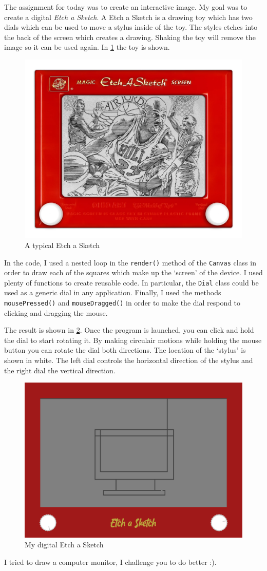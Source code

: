 The assignment for today was to create an interactive image. My goal was to create a digital \textit{Etch a Sketch}. A Etch a Sketch is a drawing toy which has two dials which can be used to move a stylus inside of the toy. The styles etches into the back of the screen which creates a drawing. Shaking the toy will remove the image so it can be used again. In \cref{fig: etch a sketch} the toy is shown.

\begin{figure}[H]
    \centering
    \includegraphics[width = 0.5 \textwidth]{Figures/day_4/etch_a_sketch.png}
    \caption{A typical Etch a Sketch}
    \label{fig: etch a sketch}
\end{figure}

In the code, I used a nested loop in the \texttt{render()} method of the \texttt{Canvas} class in order to draw each of the squares which make up the `screen' of the device. I used plenty of functions to create reusable code. In particular, the \texttt{Dial} class could be used as a generic dial in any application. Finally, I used the methods \texttt{mousePressed()} and \texttt{mouseDragged()} in order to make the dial respond to clicking and dragging the mouse.

\medskip

The result is shown in \cref{fig: my etch a sketch}. Once the program is launched, you can click and hold the dial to start rotating it. By making circulair motions while holding the mouse button you can rotate the dial both directions. The location of the `stylus' is shown in white. The left dial controls the horizontal direction of the stylus and the right dial the vertical direction.

\begin{figure}[H]
    \centering
    \includegraphics[width = 0.5 \textwidth]{Figures/day_4/my_etch_a_sketch.png}
    \caption{My digital Etch a Sketch}
    \label{fig: my etch a sketch}
\end{figure}

I tried to draw a computer monitor, I challenge you to do better :).